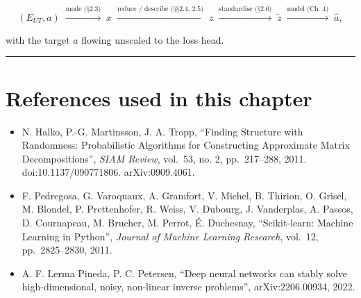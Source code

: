 \documentclass[
  english,
  11pt,
]{report}
\providecommand{\tightlist}{%
  \setlength{\itemsep}{0pt}\setlength{\parskip}{0pt}}
\begin{document}
\[
(E_{UT}, a)\;\xrightarrow{\text{mode (§2.3)}}\;x\;\xrightarrow{\text{reduce / describe (§§2.4, 2.5)}}\;z\;\xrightarrow{\text{standardise (§2.6)}}\;\tilde z\;\xrightarrow{\text{model (Ch. 4)}}\;\hat a,
\]

with the target \(a\) flowing unscaled to the loss head.

\begin{center}\rule{0.5\linewidth}{0.5pt}\end{center}

\section{References used in this
chapter}\label{references-used-in-this-chapter-1}

\begin{itemize}
\tightlist
\item
  N. Halko, P.-G. Martinsson, J. A. Tropp, ``Finding Structure with
  Randomness: Probabilistic Algorithms for Constructing Approximate
  Matrix Decompositions'', \emph{SIAM Review}, vol.~53, no. 2,
  pp.~217--288, 2011. doi:10.1137/090771806. arXiv:0909.4061.
\item
  F. Pedregosa, G. Varoquaux, A. Gramfort, V. Michel, B. Thirion, O.
  Grisel, M. Blondel, P. Prettenhofer, R. Weiss, V. Dubourg, J.
  Vanderplas, A. Passos, D. Cournapeau, M. Brucher, M. Perrot, É.
  Duchesnay, ``Scikit-learn: Machine Learning in Python'', \emph{Journal
  of Machine Learning Research}, vol.~12, pp.~2825--2830, 2011.
\item
  A. F. Lerma Pineda, P. C. Petersen, ``Deep neural networks can stably
  solve high-dimensional, noisy, non-linear inverse problems'',
  arXiv:2206.00934, 2022.
\end{itemize}
\end{document}
